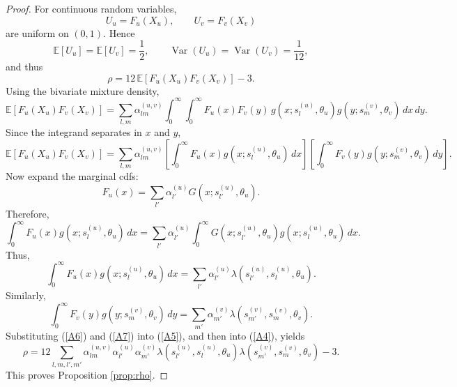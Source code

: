 \documentclass[eng]{csam}
\begin{document}
{\begin{proof}
For continuous random variables,
\begin{equation*}
U_u=F_u(X_u),\qquad U_v=F_v(X_v)
\end{equation*}
are uniform on $(0,1)$. Hence
\begin{equation*}
\mathbb E[U_u]=\mathbb E[U_v]=\frac12, \qquad \operatorname{Var}(U_u)=\operatorname{Var}(U_v)=\frac1{12},
\end{equation*}
and thus
\begin{equation}\label{A4}
\rho = 12\,\mathbb E[F_u(X_u)F_v(X_v)]-3.
\end{equation}
Using the bivariate mixture density,
\begin{equation*}
\mathbb E[F_u(X_u)F_v(X_v)] = \sum_{l,m}\alpha^{(u,v)}_{lm} \int_0^\infty\int_0^\infty F_u(x)F_v(y) \, g(x;s_l^{(u)},\theta_u) g(y;s_m^{(v)},\theta_v)\,dx\,dy.
\end{equation*}
Since the integrand separates in $x$ and $y$,
\begin{equation}\label{A5}
\mathbb E[F_u(X_u)F_v(X_v)] = \sum_{l,m}\alpha^{(u,v)}_{lm} \left[ \int_0^\infty F_u(x)g(x;s_l^{(u)},\theta_u)\,dx \right] \left[ \int_0^\infty F_v(y)g(y;s_m^{(v)},\theta_v)\,dy \right].
\end{equation}
Now expand the marginal cdfs:
\begin{equation*}
F_u(x) = \sum_{l'}\alpha_{l'}^{(u)} G(x;s_{l'}^{(u)},\theta_u).
\end{equation*}
Therefore,
\begin{equation*}
\int_0^\infty F_u(x)g(x;s_l^{(u)},\theta_u)\,dx = \sum_{l'}\alpha_{l'}^{(u)} \int_0^\infty G(x;s_{l'}^{(u)},\theta_u) g(x;s_l^{(u)},\theta_u)\,dx.
\end{equation*}
Thus,
\begin{equation}\label{A6}
\int_0^\infty F_u(x)g(x;s_l^{(u)},\theta_u)\,dx = \sum_{l'}\alpha_{l'}^{(u)} \lambda(s_{l'}^{(u)},s_l^{(u)},\theta_u).
\end{equation}
Similarly,
\begin{equation}\label{A7}
\int_0^\infty F_v(y)g(y;s_m^{(v)},\theta_v)\,dy = \sum_{m'}\alpha_{m'}^{(v)}\lambda(s_{m'}^{(v)},s_m^{(v)},\theta_v).
\end{equation}
Substituting (\ref{A6}) and (\ref{A7}) into (\ref{A5}), and then into (\ref{A4}), yields
\begin{equation*}
\rho = 12 \sum_{l,m,l',m'} \alpha^{(u,v)}_{lm} \alpha_{l'}^{(u)} \alpha_{m'}^{(v)} \lambda(s_{l'}^{(u)},s_l^{(u)},\theta_u) \lambda(s_{m'}^{(v)},s_m^{(v)},\theta_v) -3.
\end{equation*}
This proves Proposition \ref{prop:rho}.
\end{proof}

}
\end{document}
